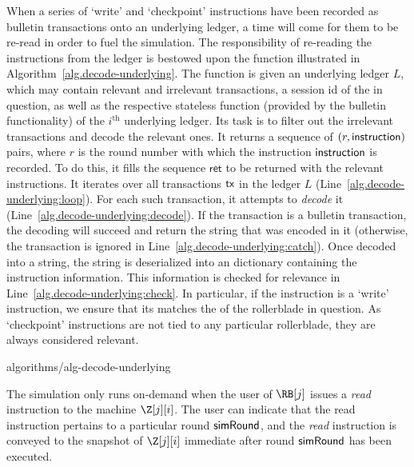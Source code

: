 When a series of `write' and `checkpoint' instructions have been recorded as bulletin
transactions onto an underlying ledger, a time will come for them to be re-read in order to fuel
the simulation. The responsibility of re-reading the instructions from the ledger is
bestowed upon the function \decodeUnderlying illustrated in
Algorithm~\ref{alg.decode-underlying}. The function is given an underlying ledger $L$,
which may contain relevant and irrelevant transactions,
a session id \sid of the \rollerblade in question,
as well as the respective stateless \decode function (provided by the bulletin functionality)
of the $i^\text{th}$ underlying ledger.
Its task is to filter out the irrelevant transactions and decode the relevant ones.
It returns a sequence of $(r, \textsf{instruction})$ pairs, where $r$ is the round number
with which the instruction $\textsf{instruction}$ is recorded.
To do this, it fills the sequence $\textsf{ret}$ to be returned with the
relevant instructions. It iterates over all transactions $\textsf{tx}$ in the ledger $L$
(Line~\ref{alg.decode-underlying:loop}). For each such transaction, it attempts
to \emph{decode} it (Line~\ref{alg.decode-underlying:decode}). If the transaction
is a bulletin transaction, the decoding will succeed and return the string that
was encoded in it (otherwise, the transaction is ignored in
Line~\ref{alg.decode-underlying:catch}). Once decoded into a string, the string
is deserialized into an dictionary containing the instruction information. This
information is checked for relevance in Line~\ref{alg.decode-underlying:check}.
In particular, if the instruction is a `write' instruction, we ensure that its
\sid matches the \sid of the rollerblade in question. As `checkpoint' instructions
are not tied to any particular rollerblade, they are always considered relevant.

{algorithms/alg-decode-underlying}

The simulation only runs
on-demand when the user of $\RB[j]$ issues a \emph{read} instruction to the machine
$\Z[j][i]$. The user can indicate that the read instruction pertains to a particular
round $\textsf{simRound}$, and the \emph{read} instruction is conveyed to the snapshot
of $\Z[j][i]$ immediate after round $\textsf{simRound}$ has been executed.

